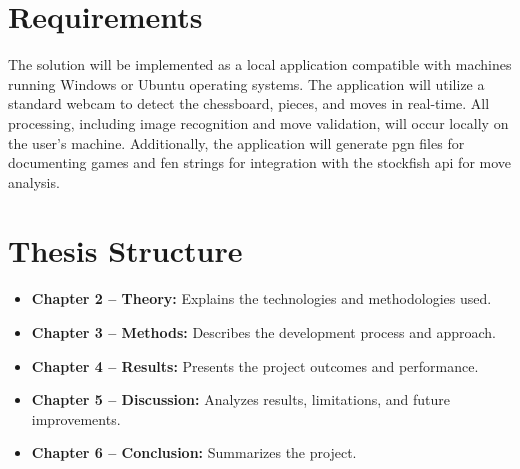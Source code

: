 \section{Requirements}

The solution will be implemented as a local application compatible with machines running Windows or Ubuntu operating systems. The application will utilize a standard webcam to detect the chessboard, pieces, and moves in real-time. All processing, including image recognition and move validation, will occur locally on the user's machine. Additionally, the application will generate \gls{pgn} files for documenting games and \gls{fen} strings for integration with the \gls{stockfish} \gls{api} for move analysis.





\section{Thesis Structure}

\begin{itemize}
    
    \item \textbf{Chapter 2 -- Theory:} Explains the technologies and methodologies used.
    
    \item \textbf{Chapter 3 -- Methods:} Describes the development process and approach.
    
    \item \textbf{Chapter 4 -- Results:} Presents the project outcomes and performance.
    
    \item \textbf{Chapter 5 -- Discussion:} Analyzes results, limitations, and future improvements.
    
    \item \textbf{Chapter 6 -- Conclusion:} Summarizes the project.
\end{itemize}






%     

